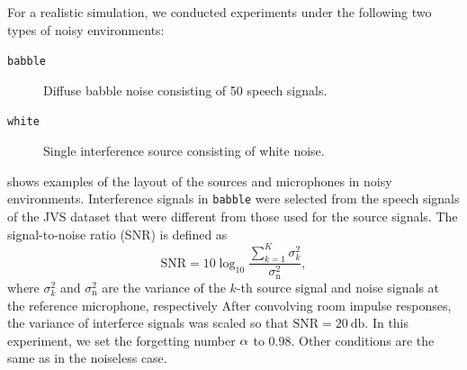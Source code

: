 \documentclass[sip,biber]{now-journal}
\begin{document}
For a realistic simulation, we conducted experiments under the following two types of noisy environments:
\begin{description}
  \item[\texttt{babble}] Diffuse babble noise consisting of 50 speech signals.
  \item[\texttt{white}] Single interference source consisting of white noise.
\end{description}
 shows examples of the layout of the sources and microphones in noisy environments.
Interference signals in \texttt{babble} were selected from the speech signals of the JVS dataset that were different from those used for the source signals.
The signal-to-noise ratio (SNR) is defined as
\begin{equation}
  \text{SNR} = 10 \log _{10} \frac{\sum _{k=1} ^{K} \sigma _{k} ^{2}}{\sigma _{\mathrm{n}} ^{2}},
\end{equation}
where $\sigma _{k} ^{2}$ and $\sigma _\mathrm{n} ^{2}$ are the variance of the $k$-th source signal and noise signals at the reference microphone, respectively
After convolving room impulse responses, the variance of interferce signals was scaled so that $\text{SNR} = \SI{20}{\decibel}$.
In this experiment, we set the forgetting number $\alpha$ to 0.98.
Other conditions are the same as in the noiseless case.
\end{document}

